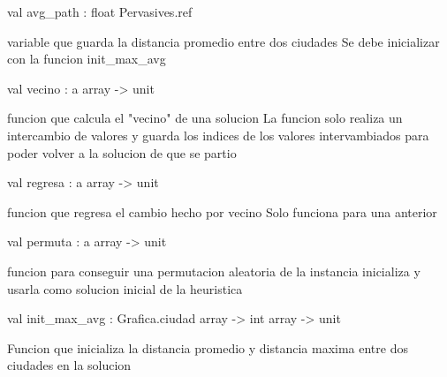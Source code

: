 \documentclass[11pt]{article}
\begin{document}
\label{val:Solucion.avg-underscorepath}\begin{ocamldoccode}
val avg_path : float Pervasives.ref
\end{ocamldoccode}
\begin{ocamldocdescription}
variable que guarda la distancia promedio entre dos ciudades
Se debe inicializar con la funcion init\_max\_avg


\end{ocamldocdescription}




\label{val:Solucion.vecino}\begin{ocamldoccode}
val vecino : {\textquotesingle}a array -> unit
\end{ocamldoccode}
\begin{ocamldocdescription}
funcion que calcula el "vecino" de una solucion
La funcion solo realiza un intercambio de valores y guarda los indices de los
valores intervambiados para poder volver a la solucion de que se partio


\end{ocamldocdescription}




\label{val:Solucion.regresa}\begin{ocamldoccode}
val regresa : {\textquotesingle}a array -> unit
\end{ocamldoccode}
\begin{ocamldocdescription}
funcion que regresa el cambio hecho por vecino
Solo funciona para una anterior


\end{ocamldocdescription}




\label{val:Solucion.permuta}\begin{ocamldoccode}
val permuta : {\textquotesingle}a array -> unit
\end{ocamldoccode}
\begin{ocamldocdescription}
funcion para conseguir una permutacion aleatoria de la instancia inicializa
y usarla como solucion inicial de la heuristica


\end{ocamldocdescription}




\label{val:Solucion.init-underscoremax-underscoreavg}\begin{ocamldoccode}
val init_max_avg : Grafica.ciudad array -> int array -> unit
\end{ocamldoccode}
\begin{ocamldocdescription}
Funcion que inicializa la distancia promedio y distancia maxima entre dos ciudades
en la solucion


\end{ocamldocdescription}
\end{document}
